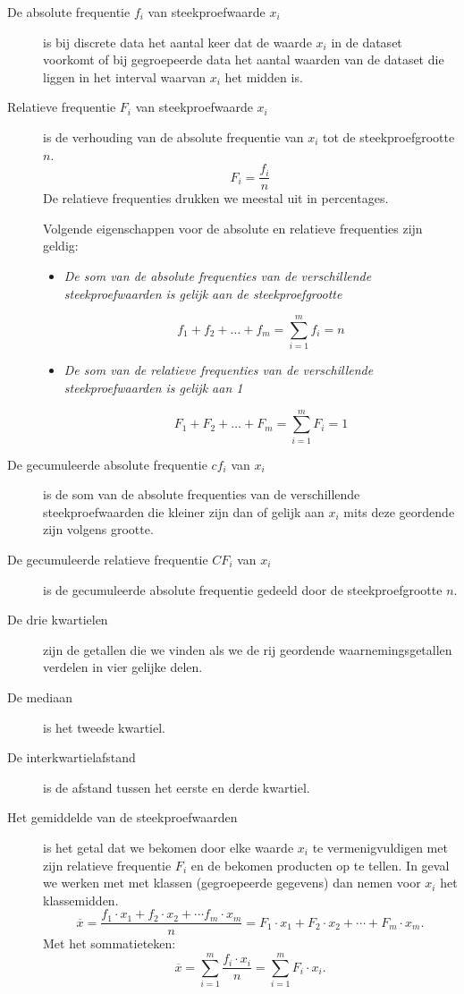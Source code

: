 \begin{small}
\begin{description}
\item[De absolute frequentie $f_i$ van steekproefwaarde $x_i$] is bij discrete data    het aantal keer dat de waarde  $x_i$ in de dataset voorkomt of bij gegroepeerde data het aantal waarden van de dataset die liggen in het interval waarvan $x_i$ het midden is. 
\item[Relatieve frequentie $F_i$ van steekproefwaarde $x_i$] is de verhouding van de absolute frequentie van $x_i$  tot de steekproefgrootte $n$.
$$F_i=\frac{f_i}{n}$$
 De relatieve frequenties drukken we meestal uit in percentages.

Volgende eigenschappen voor de absolute en relatieve frequenties zijn geldig:

\begin{itemize}
\item {\em De som van de absolute frequenties van de verschillende steekproefwaarden is gelijk aan de steekproefgrootte}


\begin{equation} \label{absfreq}
f_1+f_2+\ldots +f_m =\sum_{i=1}^mf_i=n
\end{equation} 

\item {\em De som van de relatieve frequenties van de verschillende steekproefwaarden is gelijk aan 1}


\begin{equation}\label{relfreq}
F_1+F_2+\ldots +F_m=\sum_{i=1}^mF_i=1
\end{equation}
\end{itemize}

\item[De gecumuleerde absolute frequentie $cf_i$ van  $x_i$] is de som van de absolute frequenties van de verschillende steekproefwaarden  die kleiner zijn dan of gelijk aan $x_i$ mits deze geordende zijn volgens grootte.
 \item[De gecumuleerde relatieve frequentie $CF_i$ van  $x_i$] is de gecumuleerde absolute frequentie gedeeld door de steekproefgrootte $n$. 
\item[De drie kwartielen] zijn de getallen die we vinden als we de rij geordende waarnemingsgetallen verdelen in vier gelijke delen. 
\item[De mediaan] is het tweede kwartiel. 
\item[De interkwartielafstand] is de afstand tussen het eerste en derde kwartiel.
\item[Het gemiddelde van de steekproefwaarden] is het getal dat we bekomen door elke waarde $x_i$ te
vermenigvuldigen met zijn relatieve frequentie $F_i$ en de bekomen producten 
op te tellen. In geval we werken met met klassen (gegroepeerde gegevens) dan nemen voor $x_i$ 
het klassemidden.
$$\overline{x}=\frac{f_1\cdot x_1+f_2\cdot x_2+\cdots f_m\cdot x_m}{n}=F_1\cdot x_1+F_2\cdot x_2+\cdots +F_m\cdot x_m.$$
Met het sommatieteken:
$$\overline{x}=\sum_{i=1}^m\frac{f_i\cdot x_i}{n}=\sum_{i=1}^mF_i\cdot x_i.$$
  


\end{description}
\end{small}
